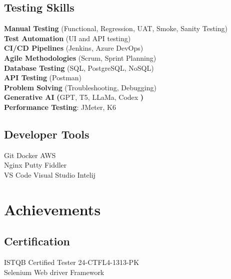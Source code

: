 \documentclass[]{deedy-resume-openfont}
\begin{document}
\begin{minipage}[t]{0.33\textwidth}
\subsection{Testing Skills}
\location{}
\textbullet{} \textbf{Manual Testing} (Functional, Regression, UAT, Smoke, Sanity Testing)\\
\vspace{0.2 em}
\textbullet{} \textbf{Test Automation} (UI and API testing) \\
\vspace{0.2 em}
\textbullet{} \textbf{CI/CD Pipelines} (Jenkins, Azure DevOps) \\
\vspace{0.2 em}
\textbullet{} \textbf{Agile Methodologies} (Scrum, Sprint Planning) \\
\vspace{0.2 em}
\textbullet{} \textbf{Database Testing} (SQL, PostgreSQL, NoSQL) \\
\vspace{0.2 em}
\textbullet{} \textbf{API Testing} (Postman) \\
\vspace{0.2 em}
\textbullet{} \textbf{Problem Solving} (Troubleshooting, Debugging) \\
\vspace{0.2 em}
\textbullet{} \textbf{Generative AI}\textbf{ (}GPT, T5, LLaMa, Codex\textbf{ )} \\
\vspace{0.2 em}
\textbullet{} \textbf{Performance Testing}: JMeter, K6\\
\vspace{0.3 em}
\subsection{Developer  Tools}
\location{}
Git \textbullet{} Docker \textbullet{} AWS \\
Nginx \textbullet{}  Putty \textbullet{} Fiddler  \\
VS Code \textbullet{}  Visual Studio \textbullet{} Intelij  \\
\sectionsep


\section{Achievements}
\subsection{Certification  }
\location{}
 \textbullet{} ISTQB Certified Tester {\scriptsize 24-CTFL4-1313-PK} \\
 \vspace{0.1 em}
\textbullet{}  Selenium Web driver Framework \\
\vspace{0.1 em}

\end{minipage}
\end{document}

